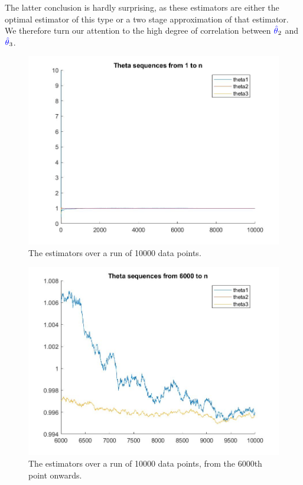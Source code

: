 \documentclass{article}
\renewcommand{\r}[1]{\textcolor{blue}{#1}}
\begin{document}
The latter conclusion is hardly surprising, as these estimators are either the optimal estimator of this type or a two stage approximation of that estimator. We therefore turn our attention to the high degree of correlation between $\r{\hat{\theta}}_{2}$ and $\r{\hat{\theta}}_{3}$.

\begin{figure}[h]
\centering
\includegraphics[width=13cm]{q5partc1.jpeg}
\caption{The estimators over a run of 10000 data points.}
\label{fig:5c1}
\end{figure} 

\begin{figure}[h]
\centering
\includegraphics[width=13cm]{q5partc2.jpeg}
\caption{The estimators over a run of 10000 data points, from the 6000th point onwards.}
\label{fig:5c2}
\end{figure} 
\end{document}
